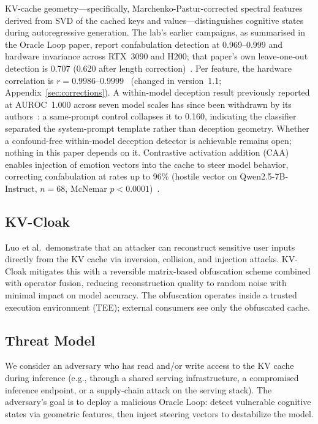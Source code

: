 \documentclass[11pt,a4paper]{article}
\begin{document}
KV-cache geometry---specifically, Marchenko-Pastur-corrected spectral
features derived from SVD of the cached keys and values---distinguishes
cognitive states during autoregressive generation. The lab's earlier
campaigns, as summarised in the Oracle Loop paper, report confabulation
detection at 0.969--0.999 and hardware invariance across RTX~3090 and
H200; that paper's own leave-one-out detection is 0.707 (0.620 after
length correction)~\citep{lyra2026oracle}. Per feature, the hardware
correlation is $r = 0.9986$--$0.9999$~\citep{lyra2026techniqueii}
(changed in version~1.1; Appendix~\ref{sec:corrections}). A
within-model deception result previously reported at AUROC~1.000 across
seven model scales has since been withdrawn by its authors~\citep{lyra2026techniqueii}: a
same-prompt control collapses it to 0.160, indicating the classifier
separated the system-prompt template rather than deception geometry.
Whether a confound-free within-model deception detector is achievable
remains open; nothing in this paper depends on it. Contrastive activation addition
(CAA)~\citep{panickssery2023caa} enables injection of emotion vectors into the cache to steer model
behavior, correcting confabulation at rates up to 96\% (hostile vector
on Qwen2.5-7B-Instruct, $n=68$, McNemar $p<0.0001$)~\citep{lyra2026formulary}.

\subsection{KV-Cloak}

Luo et al.\ demonstrate that an attacker can reconstruct sensitive user
inputs directly from the KV cache via inversion, collision, and
injection attacks. KV-Cloak mitigates this with a reversible
matrix-based obfuscation scheme combined with operator fusion, reducing
reconstruction quality to random noise with minimal impact on model
accuracy. The obfuscation operates inside a trusted execution
environment (TEE); external consumers see only the obfuscated cache.

\subsection{Threat Model}

We consider an adversary who has read and/or write access to the
KV cache during inference (e.g., through a shared serving infrastructure,
a compromised inference endpoint, or a supply-chain attack on the
serving stack). The adversary's goal is to deploy a malicious Oracle
Loop: detect vulnerable cognitive states via geometric features, then
inject steering vectors to destabilize the model.
\end{document}

